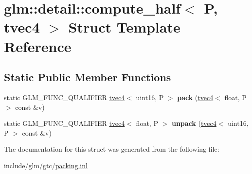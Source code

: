 \hypertarget{structglm_1_1detail_1_1compute__half_3_01P_00_01tvec4_01_4}{}\section{glm\+:\+:detail\+:\+:compute\+\_\+half$<$ P, tvec4 $>$ Struct Template Reference}
\label{structglm_1_1detail_1_1compute__half_3_01P_00_01tvec4_01_4}
\subsection*{Static Public Member Functions}
\begin{DoxyCompactItemize}
\item 
\mbox{\label{structglm_1_1detail_1_1compute__half_3_01P_00_01tvec4_01_4_a10c39dc8342760eee962fb57e5d8a391}} 
static G\+L\+M\+\_\+\+F\+U\+N\+C\+\_\+\+Q\+U\+A\+L\+I\+F\+I\+ER \hyperlink{structglm_1_1tvec4}{tvec4}$<$ uint16, P $>$ {\bfseries pack} (\hyperlink{structglm_1_1tvec4}{tvec4}$<$ float, P $>$ const \&v)
\item 
\mbox{\label{structglm_1_1detail_1_1compute__half_3_01P_00_01tvec4_01_4_a60cf0de8f240ff4836f7f96799cf5494}} 
static G\+L\+M\+\_\+\+F\+U\+N\+C\+\_\+\+Q\+U\+A\+L\+I\+F\+I\+ER \hyperlink{structglm_1_1tvec4}{tvec4}$<$ float, P $>$ {\bfseries unpack} (\hyperlink{structglm_1_1tvec4}{tvec4}$<$ uint16, P $>$ const \&v)
\end{DoxyCompactItemize}


The documentation for this struct was generated from the following file\+:\begin{DoxyCompactItemize}
\item 
include/glm/gtc/\hyperlink{packing_8inl}{packing.\+inl}\end{DoxyCompactItemize}
